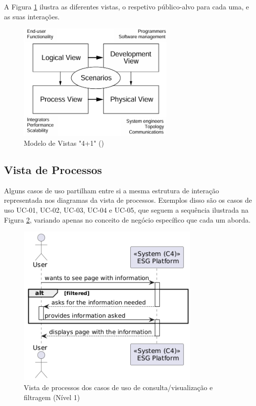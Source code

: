 A Figura \ref{fig:41viewmodel} ilustra as diferentes vistas, o respetivo público-alvo para cada uma, e as suas interações.

\begin{figure}[H]
    \centering
    \includegraphics[width=3in,keepaspectratio]{frontmatter/assets/models/4+1views.png}
    \caption{Modelo de Vistas "4+1" (\cite{Kruchten1995})}
    \label{fig:41viewmodel}
\end{figure}

\subsection{Vista de Processos}
\label{subsec:process_view}

Alguns casos de uso partilham entre si a mesma estrutura de interação representada nos diagramas da vista de processos. Exemplos disso são os casos de uso UC-01, UC-02, UC-03, UC-04 e UC-05, que seguem a sequência ilustrada na Figura \ref{fig:UC12345-lvl1}, variando apenas no conceito de negócio específico que cada um aborda.

\begin{figure}[h]
\centering
\includegraphics[width=3.5in]{frontmatter/assets/diagrams/Process Views/UC12345-lvl1.png}
\caption{Vista de processos dos casos de uso de consulta/visualização e filtragem (Nível 1)}
\label{fig:UC12345-lvl1}
\end{figure}

